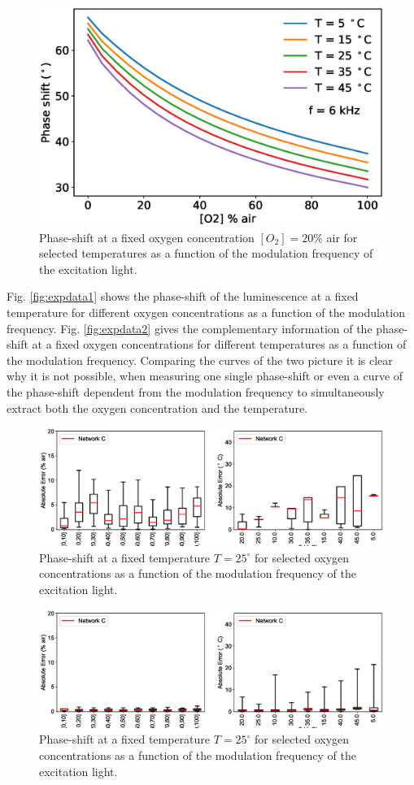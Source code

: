 \documentclass[9pt,twocolumn,twoside,pdftex]{optica}
\begin{document}
\begin{figure}[htbp]
\centering
\includegraphics[width=9 cm]{expdata3.eps}
\caption{Phase-shift at a fixed oxygen concentration $[O_2]=20 \%$ air for selected temperatures as a function of the modulation frequency of the excitation light.}
\label{fig:expdata3}
\end{figure}

Fig. \ref{fig:expdata1} shows the phase-shift of the luminescence at a fixed temperature for different oxygen concentrations as a function of the modulation frequency. Fig. \ref{fig:expdata2} gives the complementary information of the phase-shift at a fixed oxygen concentrations for different temperatures as a function of the modulation frequency. Comparing the curves of the two picture it is clear why it is not possible, when measuring one single phase-shift or even a curve of the phase-shift dependent from the modulation frequency to simultaneously extract both the oxygen concentration and the temperature. 



\begin{figure}[htbp]
\centering
\includegraphics[width=9 cm]{results_theta90.eps}
\caption{Phase-shift at a fixed temperature $T=25 ^{\circ}$ for selected oxygen concentrations as a function of the modulation frequency of the excitation light.}
\label{fig:result_90}
\end{figure}


\begin{figure}[htbp]
\centering
\includegraphics[width=9 cm]{result_theta_theta0.eps}
\caption{Phase-shift at a fixed temperature $T=25 ^{\circ}$ for selected oxygen concentrations as a function of the modulation frequency of the excitation light.}
\label{fig:result_theta0}
\end{figure}
\end{document}
